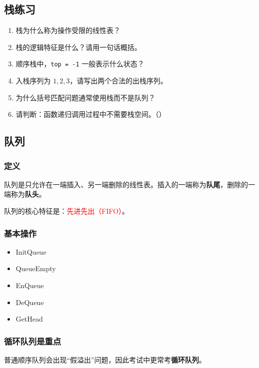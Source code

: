 \documentclass{../../note}
\begin{document}
\subsection{栈练习}

\begin{enumerate}
  \item 栈为什么称为操作受限的线性表？
  \item 栈的逻辑特征是什么？请用一句话概括。
  \item 顺序栈中，\texttt{top = -1} 一般表示什么状态？
  \item 入栈序列为 $1,2,3$，请写出两个合法的出栈序列。
  \item 为什么括号匹配问题通常使用栈而不是队列？
  \item 请判断：函数递归调用过程中不需要栈空间。（\hspace{1cm}）
\end{enumerate}

\subsection{队列}

\subsubsection{定义}

队列是只允许在一端插入、另一端删除的线性表。插入的一端称为\textbf{队尾}，删除的一端称为\textbf{队头}。

队列的核心特征是：\textcolor{red}{先进先出（FIFO）}。

\subsubsection{基本操作}

\begin{itemize}
  \item InitQueue
  \item QueueEmpty
  \item EnQueue
  \item DeQueue
  \item GetHead
\end{itemize}

\subsubsection{循环队列是重点}

普通顺序队列会出现“假溢出”问题，因此考试中更常考\textbf{循环队列}。
\end{document}
